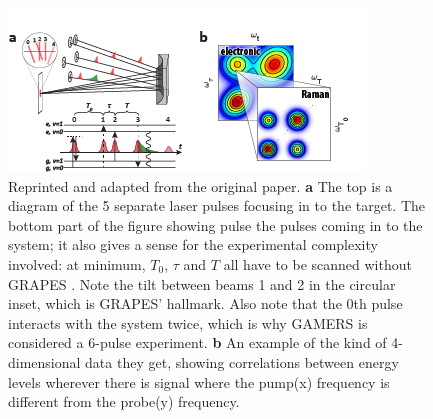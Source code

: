 \begin{figure}[h]
   \includegraphics[width=1.0\columnwidth]{Figure1_sci.png}
   \caption{Reprinted and adapted from the original paper\cite{GAMERS}. \textbf{a} The top is a diagram of the 5 separate laser pulses focusing in to the target.  The bottom part of the figure showing pulse the pulses coming in to the system; it also gives a sense for the experimental complexity involved: at minimum, $T_0$, $\tau$ and $T$ all have to be scanned without GRAPES \cite{EngelGRAPES}.  Note the tilt between beams 1 and 2 in the circular inset, which is GRAPES' hallmark.  Also note that the 0th pulse interacts with the system twice, which is why GAMERS is considered a 6-pulse experiment. \textbf{b} An example of the kind of 4-dimensional data they get, showing correlations between energy levels wherever there is signal where the pump(x) frequency is different from the probe(y) frequency.}
	\label{fig:diagram}
\end{figure}


%
